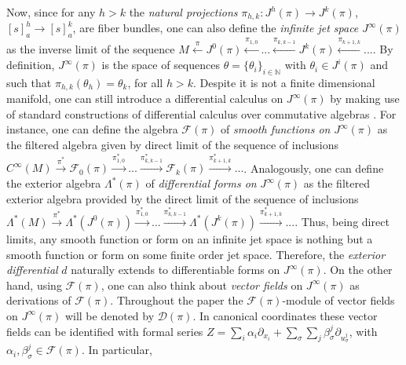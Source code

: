 \documentclass[12pt,english]{elsarticle}
\theoremstyle{plain}
\theoremstyle{plain}
\theoremstyle{remark}
\theoremstyle{plain}
\theoremstyle{definition}
\theoremstyle{definition}
\begin{document}
Now, since for any $h>k$ the \textit{natural projections}
$\pi _{h,k}:J^{h}(\pi )\rightarrow J^{k}(\pi )$,
$[s]_{a}^{h}\rightarrow [s]_{a}^{k}$, are fiber bundles, one can also define
the \textit{infinite jet space} $J^{\infty}(\pi )$ as the inverse limit
of the sequence
$M\overset{\pi}{\longleftarrow}J^{0}(\pi )
\overset{\pi _{1,0}}{\longleftarrow}...
\overset{\pi _{k,k-1}}{\longleftarrow}J^{k}(\pi )
\overset{\pi _{k+1,k}}{\longleftarrow}...$. By definition,
$J^{\infty}(\pi )$ is the space of sequences
$\theta =\{\theta _{i}\}_{i\in \mathbb{N}}$ with
$\theta _{i}\in J^{i}(\pi )$ and such that
$\pi _{h,k}(\theta _{h})=\theta _{k}$, for all $h>k$. Despite it is not
a finite dimensional manifold, one can still introduce a differential calculus
on $J^{\infty}(\pi )$ by making use of standard constructions of differential
calculus over commutative algebras \cite{B_KrV,KLV}. For instance, one
can define the algebra $\mathcal{F}(\pi )$ of
\textit{smooth functions on} $J^{\infty}(\pi )$ as the filtered algebra
given by direct limit of the sequence of inclusions
$C^{\infty}(M)\overset{\pi ^{*}}{\longrightarrow}\mathcal{F}_{0}(\pi )
\overset{\pi _{1,0}^{*}}{\longrightarrow}...
\overset{\pi _{k,k-1}^{*}}{\longrightarrow}\mathcal{F}_{k}(\pi )
\overset{\pi _{k+1,k}^{*}}{\longrightarrow}...$. Analogously, one can
define the exterior algebra $\Lambda ^{*}(\pi )$ of
\textit{differential forms on} $J^{\infty}(\pi )$ as the filtered exterior
algebra provided by the direct limit of the sequence of inclusions
$\Lambda ^{*}(M)\overset{\pi ^{*}}{\longrightarrow}\Lambda ^{*}\left (J^{0}(
\pi )\right )\overset{\pi _{1,0}^{*}}{\longrightarrow}...
\overset{\pi _{k,k-1}^{*}}{\longrightarrow}\Lambda ^{*}\left (J^{k}(
\pi )\right )\overset{\pi _{k+1,k}^{*}}{\longrightarrow}...$. Thus, being
direct limits, any smooth function or form on an infinite jet space is
nothing but a smooth function or form on some finite order jet space. Therefore,
the \textit{exterior differential} $d$ naturally extends to differentiable
forms on $J^{\infty}(\pi )$. On the other hand, using
$\mathcal{F}(\pi )$, one can also think about \textit{vector fields} on
$J^{\infty}(\pi )$ as derivations of $\mathcal{F}(\pi )$. Throughout the
paper the $\mathcal{F}(\pi )$-module of vector fields on
$J^{\infty}(\pi )$ will be denoted by $\mathcal{D}(\pi )$. In canonical
coordinates these vector fields can be identified with formal series
$Z=\sum _{i}\alpha _{i}\partial _{x_{i}}+\sum _{\sigma}\sum _{j}
\beta _{\sigma}^{j}\partial _{u_{\sigma}^{j}}$, with
$\alpha _{i},\beta _{\sigma}^{j}\in \mathcal{F}(\pi )$. In particular,
\end{document}
